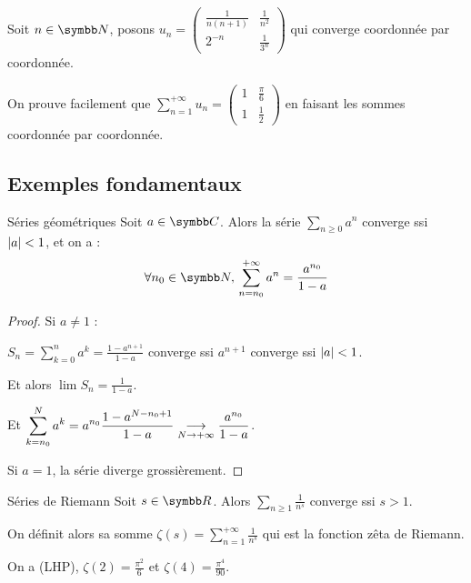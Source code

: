 \begin{exemple}
    Soit $n \in \N$, posons $u_n = 
    \begin{pmatrix}
        \frac 1 {n(n+1)} & \frac 1 {n^2}\\
        2^{-n} & \frac 1 {3^n}
    \end{pmatrix}
    $ qui converge coordonnée par coordonnée.

    On prouve facilement que $\sum_{n=1}^{+ \infty} u_n =
    \begin{pmatrix}
        1 & \frac {\pi} 6\\
        1 & \frac 1 2
    \end{pmatrix}$ en faisant les sommes coordonnée par coordonnée.
\end{exemple}

\subsection{Exemples fondamentaux}

\begin{theoreme}{Séries géométriques}{}
    Soit $a \in \C$. Alors la série $\sum_{n \geqslant 0} a^n$ converge ssi $\left|a\right| < 1$, 
    et on a : \[\forall n_0 \in \N, \, \sum_{n = n_0}^{+ \infty} a^n = \frac{a^{n_0}}{1 - a}\]
\end{theoreme}


\begin{proof}
    Si $a \neq 1$ : 

    $\displaystyle S_n = \sum_{k = 0}^{n } a^k = \frac{1 - a^{n+1}}{1 - a}$ converge ssi 
    $a^{n+1} $ converge ssi $\left|a\right| < 1$.

    Et alors $\lim S_n = \frac{1}{1 - a}$.

    Et $\displaystyle \sum_{k = n_0 }^{N} a^k = a^{n_0} \frac{1 - a^{N - n_0 + 1}}{1 - a} \underset{N \to + \infty}{\longrightarrow} \frac{a^{n_0}}{1 - a}$.

    Si $a = 1$, la série diverge grossièrement.
\end{proof}

\begin{theoreme}{Séries de Riemann}{}
    Soit $s \in \R$. Alors $\displaystyle \sum_{n \geqslant 1} \frac{1}{n^s}$ converge ssi $s > 1$.

    On définit alors sa somme $\displaystyle \zeta(s) = \sum_{n = 1}^{+\infty} \frac{1}{n^s}$ qui est la fonction zêta de Riemann.
    
    On a (LHP), $\zeta(2) = \frac{\pi^2}{6}$ et $\zeta(4) = \frac{\pi^4}{90}$.
\end{theoreme}

